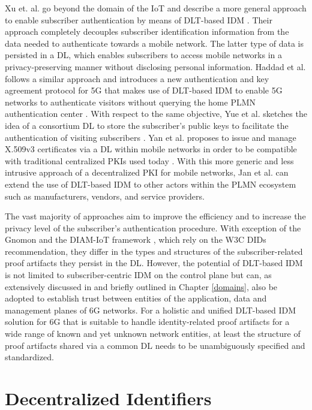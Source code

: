 \documentclass[conference]{IEEEtran}
\begin{document}
Xu et. al. go beyond the domain of the IoT and describe a more general approach to enable subscriber authentication by means of DLT-based IDM \cite{Xu.2020}. Their approach completely decouples subscriber identification information from the data needed to authenticate towards a mobile network. The latter type of data is persisted in a DL, which enables subscribers to access mobile networks in a privacy-preserving manner without disclosing personal information. Haddad et al. follows a similar approach and introduces a new authentication and key agreement protocol for 5G that makes use of DLT-based IDM to enable 5G networks to authenticate visitors without querying the home PLMN authentication center \cite{Z.Haddad.2020}. With respect to the same objective, Yue et al. sketches the idea of a consortium DL to store the subscriber's public keys to facilitate the authentication of visiting subscribers \cite{Yue.2021b}. Yan et al. proposes to issue and manage X.509v3 certificates via a DL within mobile networks in order to be compatible with traditional centralized PKIs used today \cite{J.Yan.2020}. With this more generic and less intrusive approach of a decentralized PKI for mobile networks, Jan et al. can extend the use of DLT-based IDM to other actors within the PLMN ecosystem such as manufacturers, vendors, and service providers.    

The vast majority of approaches aim to improve the efficiency and to increase the privacy level of the subscriber's authentication procedure. With exception of the Gnomon \cite{R.Ansey.2019} and the DIAM-IoT framework \cite{XinxinFan.2020}, which rely on the W3C DIDs recommendation, they differ in the types and structures of the subscriber-related proof artifacts they persist in the DL. However, the potential of DLT-based IDM is not limited to subscriber-centric IDM on the control plane but can, as extensively discussed in \cite{RodriguezGarzon.2022} and briefly outlined in Chapter \ref{domains}, also be adopted to establish trust between entities of the application, data and management planes of 6G networks. For a holistic and unified DLT-based IDM solution for 6G that is suitable to handle identity-related proof artifacts for a wide range of known and yet unknown network entities, at least the structure of proof artifacts shared via a common DL needs to be unambiguously specified and standardized.   

  
\section{Decentralized Identifiers} \label{dids}
\label{DID_SSI}
\end{document}
